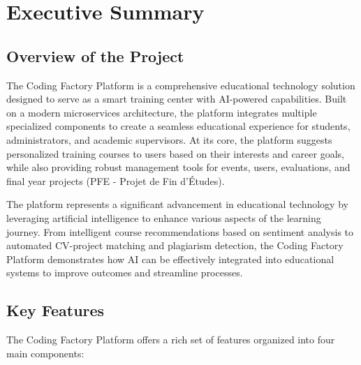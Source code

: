 \documentclass[12pt,a4paper]{report}
\begin{document}
\tableofcontents
\clearpage
\listoffigures
\clearpage
\listoftables
\clearpage


\chapter*{Executive Summary}

\section{Overview of the Project}
The Coding Factory Platform is a comprehensive educational technology solution designed to serve as a smart training center with AI-powered capabilities. Built on a modern microservices architecture, the platform integrates multiple specialized components to create a seamless educational experience for students, administrators, and academic supervisors. At its core, the platform suggests personalized training courses to users based on their interests and career goals, while also providing robust management tools for events, users, evaluations, and final year projects (PFE - Projet de Fin d'Études).

The platform represents a significant advancement in educational technology by leveraging artificial intelligence to enhance various aspects of the learning journey. From intelligent course recommendations based on sentiment analysis to automated CV-project matching and plagiarism detection, the Coding Factory Platform demonstrates how AI can be effectively integrated into educational systems to improve outcomes and streamline processes.

\section{Key Features}
The Coding Factory Platform offers a rich set of features organized into four main components:
\end{document}
